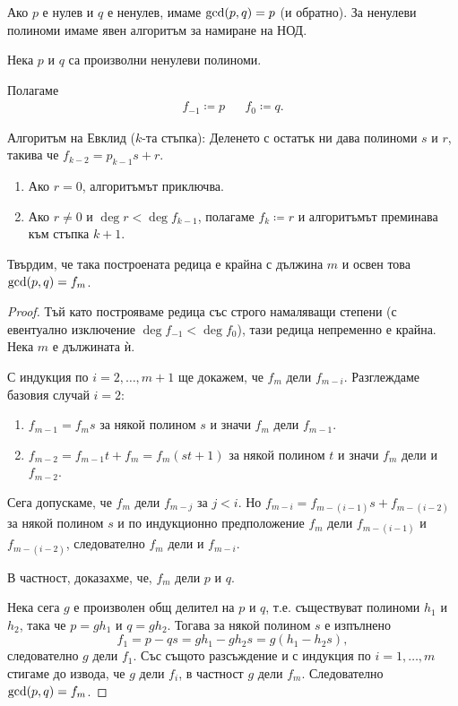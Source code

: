 \documentclass[numbers=endperiod, DIV=15, bibliography=totocnumbered]{scrartcl}
\begin{document}
Ако $p$ е нулев и $q$ е ненулев, имаме $\operatorname{gcd}(p, q) = p$ (и обратно). За ненулеви полиноми имаме явен алгоритъм за намиране на НОД.
\begin{theorem}
  Нека $p$ и $q$ са произволни ненулеви полиноми.

  Полагаме
  \begin{align*}
     f_{-1} \coloneqq p &&
     f_0 \coloneqq q.
  \end{align*}

  Алгоритъм на Евклид ($k$-та стъпка): Деленето с остатък ни дава полиноми $s$ и $r$, такива че $f_{k-2} = p_{k-1} s + r$.
    \begin{enumerate}
      \item Ако $r = 0$, алгоритъмът приключва.
      \item Ако $r \neq 0$ и $\deg r < \deg f_{k-1}$, полагаме $f_k \coloneqq r$ и алгоритъмът преминава към стъпка $k + 1$.
    \end{enumerate}

  Твърдим, че така построената редица е крайна с дължина $m$ и освен това $\operatorname{gcd}(p, q) = f_m$.
\end{theorem}
\begin{proof}
  Тъй като построяваме редица със строго намаляващи степени (с евентуално изключение $\deg f_{-1} < \deg f_0$), тази редица непременно е крайна. Нека $m$ е дължината ѝ.

  С индукция по $i = 2, \ldots, m + 1$ ще докажем, че $f_m$ дели $f_{m-i}$. Разглеждаме базовия случай $i = 2$:
  \begin{enumerate}
    \item $f_{m-1} = f_m s$ за някой полином $s$ и значи $f_m$ дели $f_{m-1}$.
    \item $f_{m-2} = f_{m-1} t + f_m = f_m (s t + 1)$ за някой полином $t$ и значи $f_m$ дели и $f_{m-2}$.
  \end{enumerate}

  Сега допускаме, че $f_m$ дели $f_{m-j}$ за $j < i$. Но $f_{m-i} = f_{m-(i-1)} s + f_{m-(i-2)}$ за някой полином $s$ и по индукционно предположение $f_m$ дели $f_{m-(i-1)}$ и $f_{m-(i-2)}$, следователно $f_m$ дели и $f_{m-i}$.

  В частност, доказахме, че, $f_m$ дели $p$ и $q$.

  Нека сега $g$ е произволен общ делител на $p$ и $q$, т.е. съществуват полиноми $h_1$ и $h_2$, така че $p = g h_1$ и $q = g h_2$. Тогава за някой полином $s$ е изпълнено
  \begin{displaymath}
    f_1 = p - qs = g h_1 - g h_2 s = g (h_1 - h_2 s),
  \end{displaymath}
  следователно $g$ дели $f_1$. Със същото разсъждение и с индукция по $i = 1, \ldots, m$ стигаме до извода, че $g$ дели $f_i$, в частност $g$ дели $f_m$. Следователно $\operatorname{gcd}(p, q) = f_m$.
\end{proof}
\end{document}

